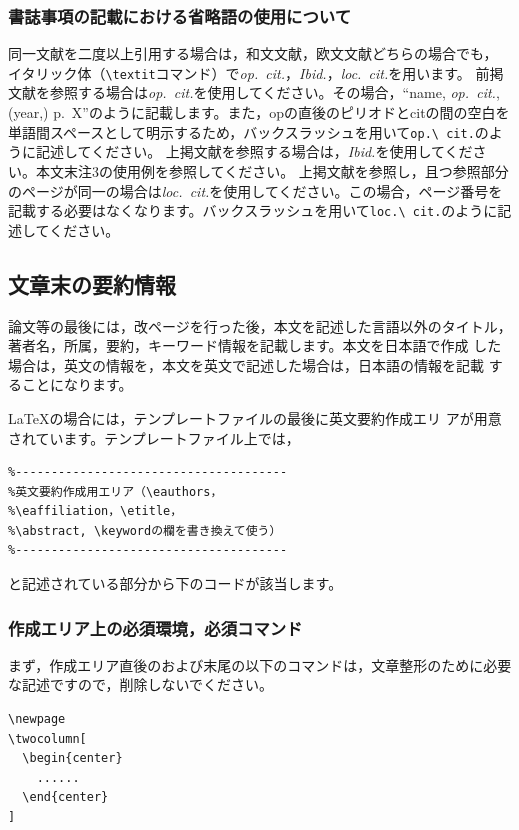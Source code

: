 \documentclass[b5paper,10pt,twocolumn,tombow]{jarticle}
\begin{document}
\subsubsection{書誌事項の記載における省略語の使用について}

同一文献を二度以上引用する場合は，和文文献，欧文文献どちらの場合でも，
イタリック体（\verb|\textit|コマンド）で\textit{op.\ cit.}，\textit{Ibid.}，\textit{loc.\ cit.}を用います。
前掲文献を参照する場合は\textit{op.\ cit.}を使用してください。その場合，``name, \textit{op.\ cit.}, (year,) p.~X''のように記載します。また，opの直後のピリオドとcitの間の空白を単語間スペースとして明示するため，バックスラッシュを用いて\verb|op.\ cit.|のように記述してください。
上掲文献を参照する場合は，\textit{Ibid.}を使用してください。本文末注3の使用例を参照してください。
上掲文献を参照し，且つ参照部分のページが同一の場合は\textit{loc.\ cit.}を使用してください。この場合，ページ番号を記載する必要はなくなります。バックスラッシュを用いて\verb|loc.\ cit.|のように記述してください。

\subsection{文章末の要約情報}
論文等の最後には，改ページを行った後，本文を記述した言語以外のタイトル，
著者名，所属，要約，キーワード情報を記載します。本文を日本語で作成
した場合は，英文の情報を，本文を英文で記述した場合は，日本語の情報を記載
することになります。

\LaTeX{}の場合には，テンプレートファイルの最後に英文要約作成エリ
アが用意されています。テンプレートファイル上では，

\small
\begin{verbatim}
%--------------------------------------
%英文要約作成用エリア（\eauthors，
%\eaffiliation，\etitle，
%\abstract, \keywordの欄を書き換えて使う）
%--------------------------------------
\end{verbatim}
\normalsize
と記述されている部分から下のコードが該当します。

\subsubsection{作成エリア上の必須環境，必須コマンド}
まず，作成エリア直後のおよび末尾の以下のコマンドは，文章整形のために必要
な記述ですので，削除しないでください。
\begin{verbatim}
\newpage
\twocolumn[
  \begin{center}
    ......
  \end{center}
]
\end{verbatim}
\end{document}
